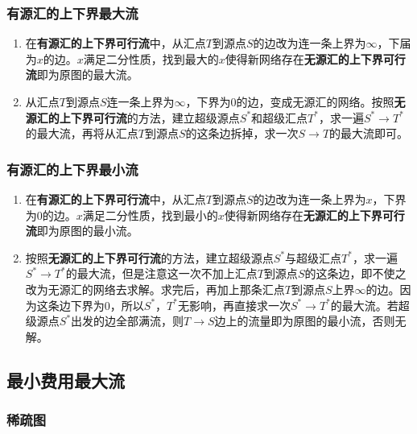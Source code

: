 \documentclass[landscape, twoside, a4paper]{article}
\begin{document}
\begin{multicols}{2}
\begin{spacing}{0.8}
\subsubsection{有源汇的上下界最大流}


\begin{enumerate}

\item 在\textbf{有源汇的上下界可行流}中，从汇点$T$到源点$S$的边改为连一条上界为$\infty$，下届为$x$的边。$x$满足二分性质，找到最大的$x$使得新网络存在\textbf{无源汇的上下界可行流}即为原图的最大流。

\item 从汇点$T$到源点$S$连一条上界为$\infty$，下界为$0$的边，变成无源汇的网络。按照\textbf{无源汇的上下界可行流}的方法，建立超级源点$S^*$和超级汇点$T^*$，求一遍$S^* \rightarrow T^*$的最大流，再将从汇点$T$到源点$S$的这条边拆掉，求一次$S \rightarrow T$的最大流即可。

\end{enumerate}


\subsubsection{有源汇的上下界最小流}


\begin{enumerate}

\item 在\textbf{有源汇的上下界可行流}中，从汇点$T$到源点$S$的边改为连一条上界为$x$，下界为$0$的边。$x$满足二分性质，找到最小的$x$使得新网络存在\textbf{无源汇的上下界可行流}即为原图的最小流。

\item 按照\textbf{无源汇的上下界可行流}的方法，建立超级源点$S^*$与超级汇点$T^*$，求一遍$S^* \rightarrow T^*$的最大流，但是注意这一次不加上汇点$T$到源点$S$的这条边，即不使之改为无源汇的网络去求解。求完后，再加上那条汇点$T$到源点$S$上界$\infty$的边。因为这条边下界为$0$，所以$S^*$，$T^*$无影响，再直接求一次$S^* \rightarrow T^*$的最大流。若超级源点$S^*$出发的边全部满流，则$T \rightarrow S$边上的流量即为原图的最小流，否则无解。

\end{enumerate}


\subsection{最小费用最大流}


\subsubsection{稀疏图}



\end{spacing}
\end{multicols}
\end{document}
